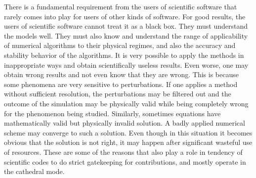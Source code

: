 \label{sec:using}
There is a fundamental requirement from the users of scientific
software that rarely comes into play for users of other kinds of
software. For good results, the users of scientific software cannot
treat it as a black box. They must understand the models well. They
must also know and understand the range of applicability of numerical
algorithms to their physical regimes, and also the accuracy and
stability behavior of the algorithms. It is very possible to apply the
methods in inappropriate ways and obtain scientifically useless
results. Even worse, one may obtain wrong results and not even know
that they are wrong. 
This is because some phenomena are very sensitive
to perturbations. If one applies a method without sufficient
resolution, the perturbations may be filtered out and the outcome of
the simulation may be physically valid while being completely wrong
for the phenomenon being studied. Similarly, sometimes equations have
mathematically valid but physically invalid solution. A badly applied
numerical scheme may converge to such a solution. Even though in this
situation it becomes obvious that the solution is not right, it may
happen after significant wasteful use of resources.
These are some of the reasons that also play a role in tendency of scientific
codes to do strict gatekeeping for contributions,  and mostly operate
in the cathedral mode.  